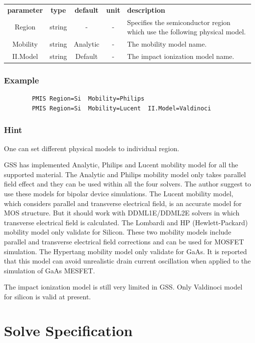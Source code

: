 \documentclass[11pt,pdftex]{article}
\begin{document}
\small \noindent\begin{longtable}{ccccp{7cm}}
\textbf{parameter}   & \textbf{type}    & \textbf{default} & \textbf{unit} & \textbf{description} \\
Region        & string  & -         & -    & Specifies the semiconductor region which use the following physical model.\\
Mobility      & string  & Analytic  & -    & The mobility model name.\\
II.Model      & string  & Default   & -    & The impact ionization model name.\\
\end{longtable}
\normalsize

\subsubsection*{Example}
\begin{verbatim}
        PMIS Region=Si  Mobility=Philips
        PMIS Region=Si  Mobility=Lucent  II.Model=Valdinoci
\end{verbatim}

\subsubsection*{Hint}
One can set different physical models to individual region.

GSS has implemented Analytic, Philips and Lucent mobility model for
all the supported material. The Analytic and Philips mobility model
only takes parallel field effect and they can be used within all the
four solvers. The author suggest to use these models for bipolar
device simulations. The Lucent mobility model, which considers
parallel and transverse electrical field, is an accurate model for
MOS structure. But it should work with DDML1E/DDML2E solvers in
which transverse electrical field is calculated. The Lombardi and HP
(Hewlett-Packard) mobility model only validate for Silicon. These
two mobility models include parallel and transverse electrical field
corrections and can be used for MOSFET simulation. The Hypertang
mobility model only validate for GaAs. It is reported that this
model can avoid unrealistic drain current oscillation when applied
to the simulation of GaAs MESFET.

The impact ionization model is still very limited in GSS. Only
Valdinoci model for silicon is valid at present.

\newpage
\section{Solve Specification}
\end{document}
